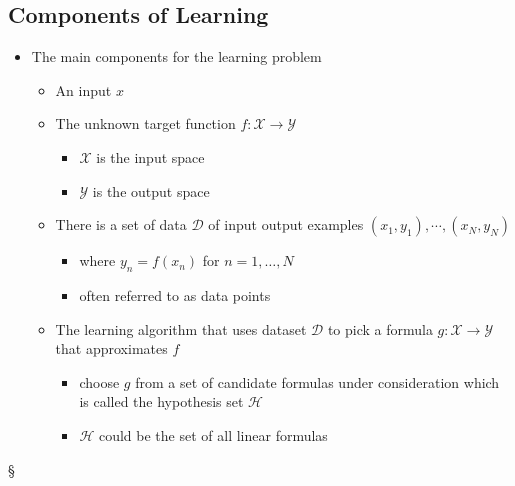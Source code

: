 \documentclass[11pt]{article}
\begin{document}
\subsection{Components of Learning}
\label{sec:org5bb1175}
\begin{itemize}
\item The main components for the learning problem
\begin{itemize}
\item An input \(x\)
\item The unknown target function \(f: \mathcal X \to \mathcal Y\)
\begin{itemize}
\item \(\mathcal X\) is the input space
\item \(\mathcal Y\) is the output space
\end{itemize}
\item There is a set of data \(\mathcal D\) of input output examples \((x_1, y_1), \cdots, (x_N, y_N)\)
\begin{itemize}
\item where \(y_n = f(x_n)\) for \(n = 1,\dots,N\)
\item often referred to as data points
\end{itemize}
\item The learning algorithm that uses dataset \(\mathcal D\) to pick a formula \(g: \mathcal X \to \mathcal Y\) that approximates \(f\)
\begin{itemize}
\item choose \(g\) from a set of candidate formulas under consideration which is called the hypothesis set \(\mathcal H\)
\item \(\mathcal H\) could be the set of all linear formulas
\end{itemize}
\end{itemize}
\end{itemize}
§
\end{document}
